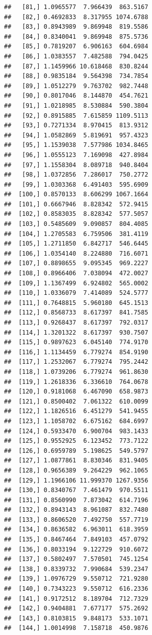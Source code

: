\documentclass[article]{jss}\usepackage[]{graphicx}\usepackage[]{xcolor}
\makeatletter
\newenvironment{kframe}{%
 \def\at@end@of@kframe{}%
 \ifinner\ifhmode%
  \def\at@end@of@kframe{\end{minipage}}%
  \begin{minipage}{\columnwidth}%
 \fi\fi%
 \def\FrameCommand##1{\hskip\@totalleftmargin \hskip-\fboxsep
 \colorbox{shadecolor}{##1}\hskip-\fboxsep
     \hskip-\linewidth \hskip-\@totalleftmargin \hskip\columnwidth}%
 \MakeFramed {\advance\hsize-\width
   \@totalleftmargin\z@ \linewidth\hsize
   \@setminipage}}%
 {\par\unskip\endMakeFramed%
 \at@end@of@kframe}
\newenvironment{knitrout}{}{} %
\makeatother
\begin{document}
\begin{knitrout}
\begin{kframe}
\begin{verbatim}
##   [81,] 1.0965577  7.966439  863.5167
##   [82,] 0.4692833  8.317955 1074.6788
##   [83,] 0.8943989  9.869948  819.5586
##   [84,] 0.8340041  9.869948  875.5736
##   [85,] 0.7819207  6.906163  604.6984
##   [86,] 1.0383557  7.482588  794.0425
##   [87,] 1.1459966 10.618468  830.8244
##   [88,] 0.9835184  9.564398  734.7854
##   [89,] 1.0512279  9.763702  982.7448
##   [90,] 0.8017046  8.144870  454.7621
##   [91,] 1.0218985  8.530884  590.3804
##   [92,] 0.8915885  7.615859 1109.5113
##   [93,] 0.7271334  8.970415  813.9312
##   [94,] 1.0582869  5.819691  957.4323
##   [95,] 1.1539038  7.577986 1034.8465
##   [96,] 1.0555123  7.169098  427.8984
##   [97,] 1.1558304  8.089718  940.8404
##   [98,] 1.0372856  7.286017  750.2772
##   [99,] 1.0303368  6.491403  595.6909
##  [100,] 0.8570133  8.606299 1067.1664
##  [101,] 0.6667946  8.828342  572.9415
##  [102,] 0.8583035  8.828342  577.5057
##  [103,] 0.5485609  9.090857  804.4085
##  [104,] 1.2705583  6.759506  381.4119
##  [105,] 1.2711850  6.842717  546.6445
##  [106,] 1.0354140  8.224880  716.6071
##  [107,] 0.8898655  9.095345  969.2227
##  [108,] 0.8966406  7.038094  472.0027
##  [109,] 1.1367499  6.924802  565.0002
##  [110,] 1.0336079  7.414089  524.5777
##  [111,] 0.7648815  5.960180  645.1513
##  [112,] 0.8568733  8.617397  841.7585
##  [113,] 0.9268437  8.617397  792.0317
##  [114,] 1.3201322  8.617397  930.7507
##  [115,] 0.9897623  6.045140  774.9170
##  [116,] 1.1134459  6.779274  854.9190
##  [117,] 1.2532067  6.779274  795.2442
##  [118,] 1.0739206  6.779274  961.8630
##  [119,] 1.2618336  6.336610  764.0678
##  [120,] 0.9181068  6.467090  658.9873
##  [121,] 0.8500402  7.061322  610.0099
##  [122,] 1.1826516  6.451279  541.9455
##  [123,] 1.1058702  6.675162  684.6997
##  [124,] 0.5933470  6.900704  983.1433
##  [125,] 0.9552925  6.123452  773.7122
##  [126,] 0.6959789  5.198625  549.5797
##  [127,] 1.0877861  8.830346  831.9405
##  [128,] 0.9656389  9.264229  962.1065
##  [129,] 1.1966106 11.999370 1267.9356
##  [130,] 0.8340767  7.461479  970.5511
##  [131,] 0.8560990  7.873042  614.7196
##  [132,] 0.8943143  8.961087  832.7480
##  [133,] 0.8606520  7.492750  557.7719
##  [134,] 0.8636582  6.963011  618.3959
##  [135,] 0.8467464  7.849103  457.0792
##  [136,] 0.8033194  9.122729  910.6072
##  [137,] 0.5802497  7.570501  745.1254
##  [138,] 0.8339732  7.990684  539.2347
##  [139,] 1.0976729  9.550712  721.9280
##  [140,] 0.7343223  9.550712  616.2336
##  [141,] 0.9172512  8.189704  712.7329
##  [142,] 0.9404881  7.677177  575.2692
##  [143,] 0.8103815  9.848173  533.1071
##  [144,] 1.0014998  7.158718  450.9876

\end{verbatim}
\end{kframe}
\end{knitrout}
\end{document}
